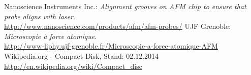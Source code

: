 \documentclass[a4paper, parskip=half, 12pt, bibliography=totocnumbered]{scrartcl}
\begin{document}

%



\begin{thebibliography}{10}
 Nanoscience Instruments Inc.: \emph{Alignment grooves on AFM chip to ensure that probe aligns with laser}.\\
\url{http://www.nanoscience.com/products/afm/afm-probes/}
 UJF Grenoble: \emph{Microscopie à force atomique}.\\
\url{http://www-liphy.ujf-grenoble.fr/Microscopie-a-force-atomique-AFM}
 Wikipedia.org - Compact Disk, Stand: 02.12.2014\\
\url{http://en.wikipedia.org/wiki/Compact_disc}
\end{thebibliography}
\end{document}

